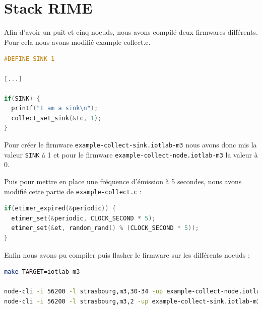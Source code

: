 \documentclass[	DIV=calc,%
							paper=a4,%
							fontsize=11pt,%
			  ]{scrartcl}	 					%
\begin{document}
\section{Stack RIME}

Afin d'avoir un puit et cinq noeuds, nous avons compilé deux firmwares différents. Pour cela nous avons modifié example-collect.c. 

\begin{lstlisting}[language=C]
#DEFINE SINK 1

[...]

if(SINK) {
  printf("I am a sink\n");
  collect_set_sink(&tc, 1);
}
\end{lstlisting}

Pour créer le firmware \texttt{example-collect-sink.iotlab-m3} nous avons donc mis la valeur \texttt{SINK} à 1 et pour le firmware \texttt{example-collect-node.iotlab-m3} la valeur à 0.


Puis pour mettre en place une fréquence d'émission à 5 secondes, nous avons modifié cette partie de \texttt{example-collect.c} :

\begin{lstlisting}[language=C]
if(etimer_expired(&periodic)) {
  etimer_set(&periodic, CLOCK_SECOND * 5);
  etimer_set(&et, random_rand() % (CLOCK_SECOND * 5));
}
\end{lstlisting}

Enfin nous avons pu compiler puis flasher le firmware sur les différents noeuds :

\begin{lstlisting}[language=bash]
make TARGET=iotlab-m3

node-cli -i 56200 -l strasbourg,m3,30-34 -up example-collect-node.iotlab-m3 
node-cli -i 56200 -l strasbourg,m3,2 -up example-collect-sink.iotlab-m3 
\end{lstlisting}
\end{document}
